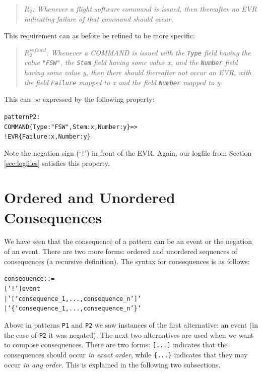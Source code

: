 \documentclass{report}
\newenvironment{code}[1] %
{
\vspace{0.5cm}
\begin{center}
\begin{Sbox}
\begin{minipage}{11cm}
\begin{alltt}
{\bf\em #1}
}
{
\end{alltt}
\end{minipage}
\end{Sbox}
\setlength{\fboxsep}{8pt}
\fbox{\TheSbox}
\end{center}
\vspace{0.5cm}
}
\begin{document}
\begin{quote}
	{\em $R_2$: Whenever a flight software command is issued, then 
	thereafter no EVR indicating failure of that command should occur.} 
\end{quote}

\noindent This requirement can as before be refined to be more specific:

\begin{quote}
	{\em $R^{refined}_2$: Whenever a  COMMAND is issued with the {\tt Type} field having the value {\tt "FSW"}, 
	    the {\tt Stem} field having some value x,  and the {\tt Number} field having some value y, then 
	    there should thereafter not occur an EVR, with  	    the field 	{\tt Failure} mapped to x and the field {\tt Number} mapped to y.}
\end{quote}

\noindent This can be expressed by the following property:

\begin{code}{}
  pattern P2:  
    COMMAND\{Type : "FSW", Stem: x, Number: y\} => 
      ! EVR\{Failure: x, Number: y\}  
\end{code}

\noindent Note the negation sign (`{\tt !}') in front of the EVR. Again, our logfile from Section \ref{sec:logfiles}
satisfies this property.

\section{Ordered and Unordered Consequences}

We have seen that the consequence of a pattern can be an event or the negation of an event. There are
two more forms: ordered and unordered sequences of consequences (a recursive definition). The syntax for
consequences is as follows:

\begin{code}{}
  consequence ::= 
     ['!'] event
   | '[' consequence_1,...,consequence_n ']'
   | '\{' consequence_1,...,consequence_n '\}'
\end{code} 

\noindent Above in patterns {\tt P1} and {\tt P2} we saw instances of the first alternative: an event (in the case of {\tt P2} it was negated).  The next two alternatives
are used when we want to compose consequences. There are two forms: {\tt [...]} indicates that the consequences
should occur {\em in exact order}, while {\tt \{...\}} indicates that they may occur {\em 
in any order}. This is explained in the following two subsections.
\end{document}
